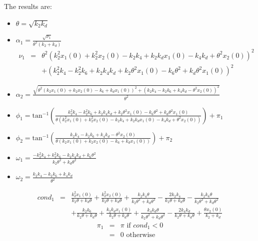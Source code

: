 \documentclass{bmcart}
\begin{document}
    The results are:

\begin{itemize}
\item
  $\theta = \sqrt{k_2 k_d}$

\item
$\alpha_1  = 
\frac{\sqrt{\nu_1}}{\theta^{2} \left(k_{2} + k_{d}\right)}$
\begin{eqnarray*}
\nu_1 & =  &
\theta^{2} \left(k_{2}^{2} x_1 (0) + k_{2}^{2} x_2 (0) - k_{2} k_{4} + k_{2} k_{d} x_1 (0) - k_{4} k_{d} + \theta^{2} x_2 (0)\right)^{2}  \\
& & +
\left(k_{2}^{2} k_{4} - k_{2}^{2} k_{6} + k_{2} k_{4} k_{d} + k_{2} \theta^{2} x_1 (0) - k_{6} \theta^{2} + k_{d} \theta^{2} x_1 (0)\right)^{2}
\end{eqnarray*}

\item
  $\alpha_2 =
  \frac{\sqrt{\theta^{2} \left(k_{2} x_1 (0) + k_{2} x_2 (0) - k_{6} + k_{d} x_1 (0)\right)^{2} + \left(k_{2} k_{4} - k_{2} k_{6} + k_{4} k_{d} - \theta^{2} x_2 (0)\right)^{2}}}{\theta^{2}}$

\item
  $\phi_1 =
  \operatorname{tan^{-1}}{\left(\frac{k_{2}^{2} k_{4} - k_{2}^{2} k_{6} + k_{2} k_{4} k_{d} + k_{2} \theta^{2} x_1 (0) - k_{6} \theta^{2} + k_{d} \theta^{2} x_1 (0)}{\theta \left(k_{2}^{2} x_1 (0) + k_{2}^{2} x_2 (0) - k_{2} k_{4} + k_{2} k_{d} x_1 (0) - k_{4} k_{d} + \theta^{2} x_2 (0)\right)} \right)} + \pi_1$

\item
  $\phi_2 = 
  \operatorname{tan^{-1}}{\left(\frac{k_{2} k_{4} - k_{2} k_{6} + k_{4} k_{d} - \theta^{2} x_2 (0)}{\theta \left(k_{2} x_1 (0) + k_{2} x_2 (0) - k_{6} + k_{d} x_1 (0)\right)} \right)} + \pi_2$

\item
  $\omega_1 = \frac{- k_{2}^{2} k_{4} + k_{2}^{2} k_{6} - k_{2} k_{4} k_{d} + k_{6} \theta^{2}}{k_{2} \theta^{2} + k_{d} \theta^{2}}$
\item
  $\omega_2 = \frac{k_{2} k_{4} - k_{2} k_{6} + k_{4} k_{d}}{\theta^{2}}$
\end{itemize}

\begin{eqnarray*}
cond_1 & = &
\frac{k_{2}^{2} x_1 (0)}{k_{2} \theta + k_{d} \theta} + \frac{k_{2}^{2} x_2 (0)}{k_{2} \theta + k_{d} \theta} + \frac{k_{2} k_{4} \theta}{k_{2} \theta^{2} + k_{d} \theta^{2}} - \frac{2 k_{2} k_{4}}{k_{2} \theta + k_{d} \theta}
- \frac{k_{2} k_{6} \theta}{k_{2} \theta^{2} + k_{d} \theta^{2}}  \\
& &
+ \frac{k_{2} k_{6}}{k_{2} \theta + k_{d} \theta} + \frac{k_{2} k_{d} x_1 (0)}{k_{2} \theta + k_{d} \theta} + \frac{k_{4} k_{d} \theta}{k_{2} \theta^{2} + k_{d} \theta^{2}} - \frac{2 k_{4} k_{d}}{k_{2} \theta + k_{d} \theta} + \frac{\theta x_2 (0)}{k_{2} + k_{d}}
\end{eqnarray*}
\begin{eqnarray*}
\pi_1 & = & \pi \text{ if } cond_1 < 0 \\
& = & 0 \text { otherwise}
\end{eqnarray*}
\end{document}
